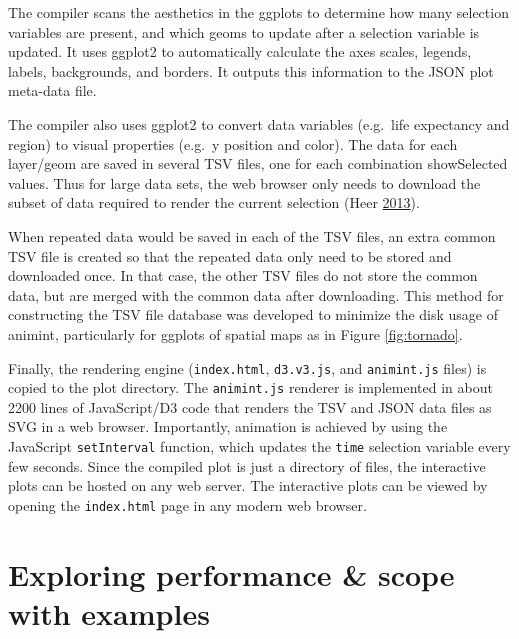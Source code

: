 \documentclass[12pt,]{isuthesis}
\begin{document}
The compiler scans the aesthetics in the ggplots to determine how many
selection variables are present, and which geoms to update after a
selection variable is updated. It uses ggplot2 to automatically
calculate the axes scales, legends, labels, backgrounds, and borders. It
outputs this information to the JSON plot meta-data file.

The compiler also uses ggplot2 to convert data variables (e.g.~life
expectancy and region) to visual properties (e.g.~y position and color).
The data for each layer/geom are saved in several TSV files, one for
each combination showSelected values. Thus for large data sets, the web
browser only needs to download the subset of data required to render the
current selection (Heer \protect\hyperlink{ref-2013-immens}{2013}).

When repeated data would be saved in each of the TSV files, an extra
common TSV file is created so that the repeated data only need to be
stored and downloaded once. In that case, the other TSV files do not
store the common data, but are merged with the common data after
downloading. This method for constructing the TSV file database was
developed to minimize the disk usage of animint, particularly for
ggplots of spatial maps as in Figure \ref{fig:tornado}.

Finally, the rendering engine (\texttt{index.html}, \texttt{d3.v3.js},
and \texttt{animint.js} files) is copied to the plot directory. The
\texttt{animint.js} renderer is implemented in about 2200 lines of
JavaScript/D3 code that renders the TSV and JSON data files as SVG in a
web browser. Importantly, animation is achieved by using the JavaScript
\texttt{setInterval} function, which updates the \texttt{time} selection
variable every few seconds. Since the compiled plot is just a directory
of files, the interactive plots can be hosted on any web server. The
interactive plots can be viewed by opening the \texttt{index.html} page
in any modern web browser.

\section{Exploring performance \& scope with examples}
\label{sec:performance}
\end{document}
